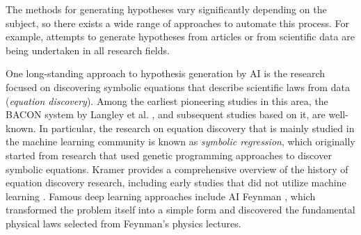 The methods for generating hypotheses vary significantly depending on the subject, so there exists a wide range of approaches to automate this process. For example, attempts to generate hypotheses from articles or from scientific data are being undertaken in all research fields. 

One long-standing approach to hypothesis generation by AI is the research focused on discovering symbolic equations that describe scientific laws from data (\textit{equation discovery}). Among the earliest pioneering studies in this area, the BACON system by Langley et al. \cite{langley1987scientific}, and subsequent studies based on it, are well-known. In particular, the research on equation discovery that is mainly studied in the machine learning community is known as \textit{symbolic regression}, which originally started from research that used genetic programming approaches to discover symbolic equations.
 Kramer provides a comprehensive overview of the history of equation discovery research, including early studies that did not utilize machine learning \cite{kramer2023automated}. Famous deep learning approaches include AI Feynman \cite{udrescu2020ai,udrescu2020ai2}, which transformed the problem itself into a simple form and discovered the fundamental physical laws selected from Feynman's physics lectures.


